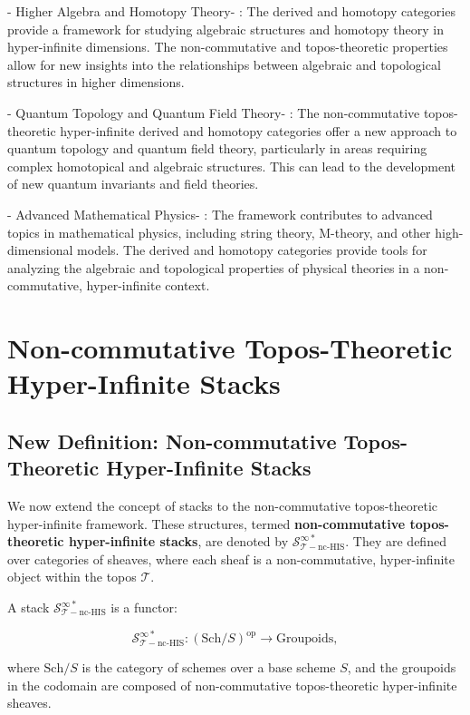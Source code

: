 \documentclass{article}
\begin{document}
-  Higher Algebra and Homotopy Theory- : The derived and homotopy categories provide a framework for studying algebraic structures and homotopy theory in hyper-infinite dimensions. The non-commutative and topos-theoretic properties allow for new insights into the relationships between algebraic and topological structures in higher dimensions.

-  Quantum Topology and Quantum Field Theory- : The non-commutative topos-theoretic hyper-infinite derived and homotopy categories offer a new approach to quantum topology and quantum field theory, particularly in areas requiring complex homotopical and algebraic structures. This can lead to the development of new quantum invariants and field theories.

-  Advanced Mathematical Physics- : The framework contributes to advanced topics in mathematical physics, including string theory, M-theory, and other high-dimensional models. The derived and homotopy categories provide tools for analyzing the algebraic and topological properties of physical theories in a non-commutative, hyper-infinite context.


\section{Non-commutative Topos-Theoretic Hyper-Infinite Stacks}
\subsection{New Definition: Non-commutative Topos-Theoretic Hyper-Infinite Stacks}
We now extend the concept of stacks to the non-commutative topos-theoretic hyper-infinite framework. These structures, termed \textbf{non-commutative topos-theoretic hyper-infinite stacks}, are denoted by \(\mathcal{S}_{\mathcal{T}-\text{nc-HIS}}^{\infty *}\). They are defined over categories of sheaves, where each sheaf is a non-commutative, hyper-infinite object within the topos \(\mathcal{T}\).

A stack \(\mathcal{S}_{\mathcal{T}-\text{nc-HIS}}^{\infty *}\) is a functor:

\[
\mathcal{S}_{\mathcal{T}-\text{nc-HIS}}^{\infty *}: (\text{Sch}/S)^{\text{op}} \to \text{Groupoids},
\]

where \(\text{Sch}/S\) is the category of schemes over a base scheme \(S\), and the groupoids in the codomain are composed of non-commutative topos-theoretic hyper-infinite sheaves.
\end{document}
